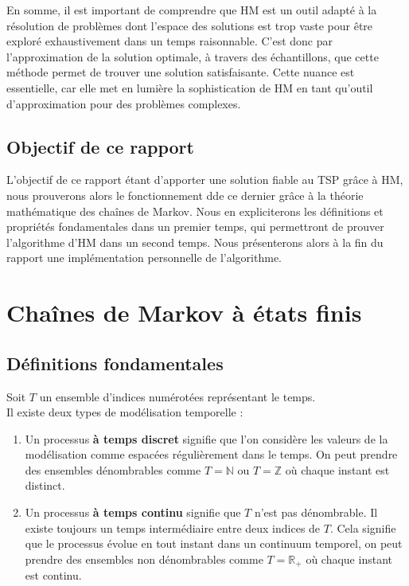 \documentclass{article}
\begin{document}
En somme, il est important de comprendre que HM est un outil adapté à la résolution de problèmes dont l'espace des solutions est trop vaste pour être exploré exhaustivement dans un temps raisonnable. C'est donc par l'approximation de la solution optimale, à travers des échantillons, que cette méthode permet de trouver une solution satisfaisante.
Cette nuance est essentielle, car elle met en lumière la sophistication de HM en tant qu'outil d'approximation pour des problèmes complexes.

\subsection{Objectif de ce rapport}

L'objectif de ce rapport étant d'apporter une solution fiable au TSP grâce à HM, nous prouverons alors le fonctionnement dde ce dernier grâce à la théorie mathématique des chaînes de Markov. Nous en expliciterons les définitions et propriétés fondamentales dans un premier temps, qui permettront de prouver l'algorithme d'HM dans un second temps. Nous présenterons alors à la fin du rapport une implémentation personnelle de l'algorithme.

\section{Chaînes de Markov à états finis}

\subsection{Définitions fondamentales}

\begin{tcolorbox}[colback=white,colframe=blue!80!black,title=Temps Discret et Temps Continu]
Soit $T$ un ensemble d'indices numérotées représentant le temps. \\

Il existe deux types de modélisation temporelle :
\begin{enumerate}[leftmargin=5em, label=(\arabic*)]
    \item Un processus \textbf{à temps discret} signifie que l'on considère les valeurs de la modélisation comme espacées régulièrement dans le temps.
          On peut prendre des ensembles dénombrables comme $T = \mathbb{N}$ ou $T = \mathbb{Z}$ où chaque instant est distinct.
    \item Un processus \textbf{à temps continu} signifie que $T$ n'est pas dénombrable. Il existe toujours un temps intermédiaire entre deux indices de $T$.
          Cela signifie que le processus évolue en tout instant dans un continuum temporel, on peut prendre des ensembles non dénombrables comme $T = \mathbb{R}_+$ où chaque instant est continu.
\end{enumerate}
\end{tcolorbox}
\end{document}
